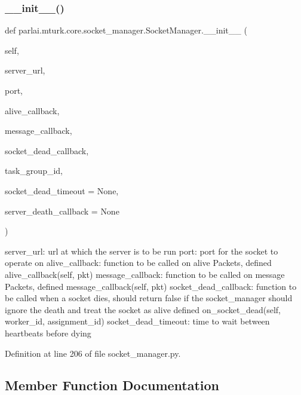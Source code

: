 \subsubsection{\texorpdfstring{\+\_\+\+\_\+init\+\_\+\+\_\+()}{\_\_init\_\_()}}
{\footnotesize\ttfamily def parlai.\+mturk.\+core.\+socket\+\_\+manager.\+Socket\+Manager.\+\_\+\+\_\+init\+\_\+\+\_\+ (\begin{DoxyParamCaption}\item[{}]{self,  }\item[{}]{server\+\_\+url,  }\item[{}]{port,  }\item[{}]{alive\+\_\+callback,  }\item[{}]{message\+\_\+callback,  }\item[{}]{socket\+\_\+dead\+\_\+callback,  }\item[{}]{task\+\_\+group\+\_\+id,  }\item[{}]{socket\+\_\+dead\+\_\+timeout = {\ttfamily None},  }\item[{}]{server\+\_\+death\+\_\+callback = {\ttfamily None} }\end{DoxyParamCaption})}

\begin{DoxyVerb}server_url:           url at which the server is to be run
port:                 port for the socket to operate on
alive_callback:       function to be called on alive Packets, defined
               alive_callback(self, pkt)
message_callback:     function to be called on message Packets, defined
               message_callback(self, pkt)
socket_dead_callback: function to be called when a socket dies, should
              return false if the socket_manager should ignore
              the death and treat the socket as alive defined
               on_socket_dead(self, worker_id, assignment_id)
socket_dead_timeout:  time to wait between heartbeats before dying
\end{DoxyVerb}
 

Definition at line 206 of file socket\+\_\+manager.\+py.



\subsection{Member Function Documentation}
\mbox{\label{classparlai_1_1mturk_1_1core_1_1socket__manager_1_1SocketManager_a1518f69049fee8c6afb27120cdd6b1f3}} 

